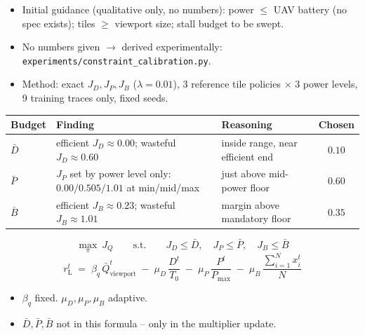 \documentclass[aspectratio=169]{beamer}
\newcommand{\Dbar}{\bar D}
\newcommand{\Pbar}{\bar P}
\newcommand{\Bbar}{\bar B}
\begin{document}
\begin{frame}
\begin{itemize}
  \item Initial guidance (qualitative only, no numbers): power $\le$ UAV battery (no spec exists); tiles $\ge$ viewport size; stall budget to be swept.
  \item No numbers given $\to$ derived experimentally: \texttt{experiments/constraint\_calibration.py}.
  \item Method: exact $J_D,J_P,J_B$ ($\lambda=0.01$), 3 reference tile policies $\times$ 3 power levels, 9 training traces only, fixed seeds.
\end{itemize}

\vspace{8pt}
\begin{center}
{\footnotesize
\begin{tabular}{p{1.5cm}p{5.8cm}p{2.6cm}c}
\toprule
Budget & Finding & Reasoning & Chosen \\
\midrule
$\Dbar$ & efficient $J_D\approx0.00$; wasteful $J_D\approx0.60$ & inside range, near efficient end & $\mathbf{0.10}$ \\
$\Pbar$ & $J_P$ set by power level only: $0.00/0.505/1.01$ at min/mid/max & just above mid-power floor & $\mathbf{0.60}$ \\
$\Bbar$ & efficient $J_B\approx0.23$; wasteful $J_B\approx1.01$ & margin above mandatory floor & $\mathbf{0.35}$ \\
\bottomrule
\end{tabular}}
\end{center}
\end{frame}

\begin{frame}
\[
\max_{\pi}\ J_Q \qquad \text{s.t.} \qquad J_D\le\Dbar,\quad J_P\le\Pbar,\quad J_B\le\Bbar
\]
\[
r_{\mathrm{L}}^t \;=\; \beta_q\,\bar Q_{\mathrm{viewport}}^t \;-\; \mu_D\,\frac{D^t}{T_0} \;-\; \mu_P\,\frac{P^t}{P_{\max}} \;-\; \mu_B\,\frac{\sum_{i=1}^{N}x_i^t}{N}
\]
\begin{itemize}
  \item $\beta_q$ fixed. $\mu_D,\mu_P,\mu_B$ adaptive.
  \item $\Dbar,\Pbar,\Bbar$ not in this formula -- only in the multiplier update.
\end{itemize}
\end{frame}
\end{document}
